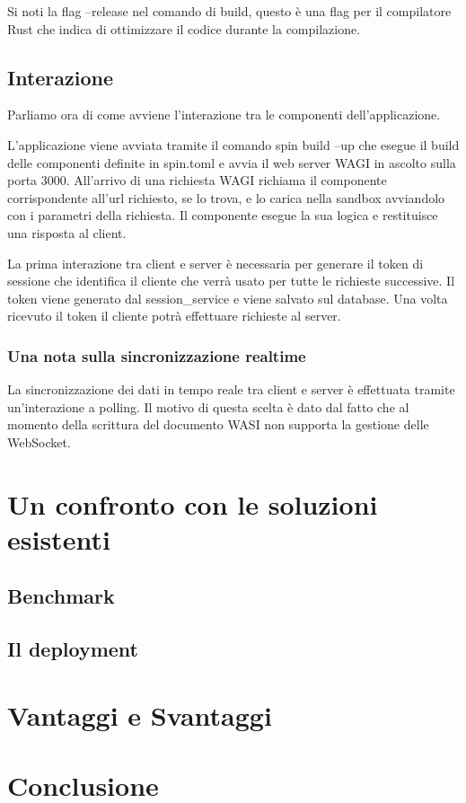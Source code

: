 Si noti la flag --release nel comando di build, questo è una flag per il compilatore Rust che indica di ottimizzare il
codice durante la compilazione.

\subsection{Interazione}
Parliamo ora di come avviene l'interazione tra le componenti dell'applicazione.

L'applicazione viene avviata tramite il comando spin build --up che esegue il build delle componenti definite in
spin.toml e avvia il web server WAGI in ascolto sulla porta 3000. All'arrivo di una richiesta WAGI richiama il
componente corrispondente all'url richiesto, se lo trova, e lo carica nella sandbox avviandolo con i parametri della
richiesta. Il componente esegue la sua logica e restituisce una risposta al client.

La prima interazione tra client e server è necessaria per generare il token di sessione che identifica il cliente che
verrà usato per tutte le richieste successive. Il token viene generato dal session\_service e viene salvato sul
database. Una volta ricevuto il token il cliente potrà effettuare richieste al server.


\subsubsection{Una nota sulla sincronizzazione realtime}
La sincronizzazione dei dati in tempo reale tra client e server è effettuata tramite un'interazione a polling. Il motivo
di questa scelta è dato dal fatto che al momento della scrittura del documento WASI non supporta la gestione delle
WebSocket.

\section{Un confronto con le soluzioni esistenti}

\subsection{Benchmark}

\subsection{Il deployment}
\section{Vantaggi e Svantaggi}


\section{Conclusione}